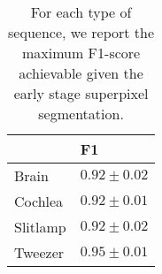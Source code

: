 \begin{table}
\centering
\caption{For each type of sequence, we report the maximum F1-score achievable given the early stage superpixel segmentation.}
\label{tab:sp_errors}
\begin{tabular}{lp{1.8cm}}
\toprule
{} &               F1 \\
\midrule
Brain    &  $0.92 \pm 0.02$ \\
Cochlea  &  $0.92 \pm 0.01$ \\
Slitlamp &  $0.92 \pm 0.02$ \\
Tweezer  &  $0.95 \pm 0.01$ \\
\bottomrule
\end{tabular}
\end{table}
